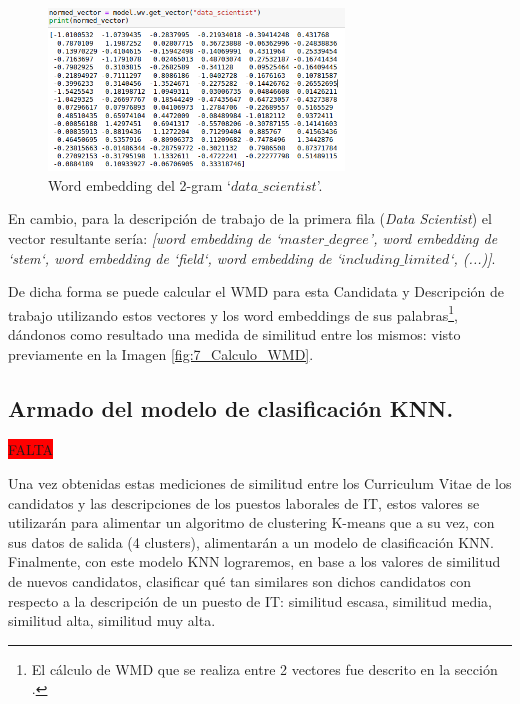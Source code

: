 \documentclass[12pt,a4paper]{article}
\begin{document}
\begin{sloppypar}
\begin{figure}[H] 
 \centering
 \includegraphics[width=0.7\textwidth]{images/implementacion_5/8_Word_emb.png}
\captionsetup{justification=centering,margin=3cm}
 \caption{Word embedding del 2-gram ‘$data\_scientist$’.} 
 \label{fig:8_Word_emb}
\end{figure}

En cambio, para la descripción de trabajo de la primera fila (\textit{Data Scientist}) el vector resultante sería: \textit{[word embedding de ‘$master\_degree$', word embedding de ‘stem‘, word embedding de ‘field‘, word embedding de ‘$including\_limited$‘, (...)]}. 

De dicha forma se puede calcular el WMD para esta Candidata y Descripción de trabajo utilizando estos vectores y los word embeddings de sus palabras\footnote{El cálculo de WMD que se realiza entre 2 vectores fue descrito en la sección \textit{}.}, dándonos como resultado una medida de similitud entre los mismos: visto previamente en la Imagen \ref{fig:7_Calculo_WMD}.

\cleardoublepage

\subsection{Armado del modelo de clasificación KNN.}\label{IMP_Modelo_clasificacion_KNN}
\colorbox{red}{FALTA}

Una vez obtenidas estas mediciones de similitud entre los Curriculum Vitae de los candidatos y las descripciones de los puestos laborales de IT, estos valores se utilizarán para alimentar un algoritmo de clustering K-means que a su vez, con sus datos de salida (4 clusters), alimentarán a un modelo de clasificación KNN. Finalmente, con este modelo KNN lograremos, en base a los valores de similitud de nuevos candidatos, clasificar qué tan similares son dichos candidatos con respecto a la descripción de un puesto de IT: similitud escasa, similitud media, similitud alta, similitud muy alta.


\end{sloppypar}
\end{document}
